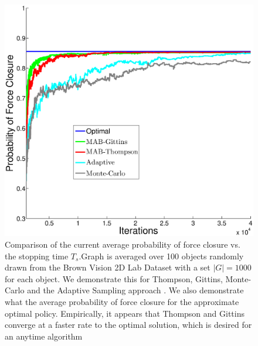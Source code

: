 \documentclass[10pt, conference]{ieeeconf}      %
\begin{document}
\begin{figure}[ht!]
\centering
\includegraphics[scale=0.25]{matlab_figures/pfc.eps}
\caption{ \footnotesize Comparison of the current average probability of force closure vs. the stopping time $T_s$.Graph is averaged over 100 objects randomly drawn from the Brown Vision 2D Lab Dataset \cite{brown} with a set $|G|=1000$ for each object.  We demonstrate this for Thompson, Gittins, Monte-Carlo and the Adaptive Sampling approach \cite{kehoe2012toward}. We also demonstrate what the average probability of force closure for the approximate optimal policy. Empirically, it appears that Thompson and Gittins converge at a faster rate to the optimal solution, which is desired for an anytime algorithm  }
\vspace*{-10pt}
\label{fig:grasp_quality}
\end{figure}
\end{document}
